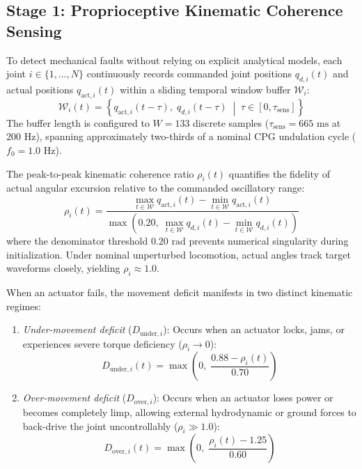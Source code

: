 \documentclass{iopjournal}
\begin{document}
\subsection{Stage 1: Proprioceptive Kinematic Coherence Sensing}
To detect mechanical faults without relying on explicit analytical models, each joint $i \in \{1, \dots, N\}$ continuously records commanded joint positions $q_{d,i}(t)$ and actual positions $q_{\text{act},i}(t)$ within a sliding temporal window buffer $\mathcal{W}_i$:
\begin{equation}
\mathcal{W}_i(t) = \left\{ q_{\text{act},i}(t - \tau), \; q_{d,i}(t - \tau) \;\middle|\; \tau \in [0, \tau_{\text{sens}}] \right\}
\end{equation}
The buffer length is configured to $W = 133$ discrete samples ($\tau_{\text{sens}} = 665\text{ ms}$ at $200\text{ Hz}$), spanning approximately two-thirds of a nominal CPG undulation cycle ($f_0 = 1.0\text{ Hz}$).

The peak-to-peak kinematic coherence ratio $\rho_i(t)$ quantifies the fidelity of actual angular excursion relative to the commanded oscillatory range:
\begin{equation}
\rho_i(t) = \frac{\max_{t \in \mathcal{W}} q_{\text{act},i}(t) - \min_{t \in \mathcal{W}} q_{\text{act},i}(t)}{\max\!\left(0.20,\; \max_{t \in \mathcal{W}} q_{d,i}(t) - \min_{t \in \mathcal{W}} q_{d,i}(t)\right)}
\label{eq:coherence_ratio}
\end{equation}
where the denominator threshold $0.20\text{ rad}$ prevents numerical singularity during initialization. Under nominal unperturbed locomotion, actual angles track target waveforms closely, yielding $\rho_i \approx 1.0$.

When an actuator fails, the movement deficit manifests in two distinct kinematic regimes:
\begin{enumerate}[label=(\alph*)]
  \item \textit{Under-movement deficit} ($D_{\text{under},i}$): Occurs when an actuator locks, jams, or experiences severe torque deficiency ($\rho_i \to 0$):
  \begin{equation}
  D_{\text{under},i}(t) = \max\!\left(0,\; \frac{0.88 - \rho_i(t)}{0.70}\right)
  \label{eq:deficit_under}
  \end{equation}
  \item \textit{Over-movement deficit} ($D_{\text{over},i}$): Occurs when an actuator loses power or becomes completely limp, allowing external hydrodynamic or ground forces to back-drive the joint uncontrollably ($\rho_i \gg 1.0$):
  \begin{equation}
  D_{\text{over},i}(t) = \max\!\left(0,\; \frac{\rho_i(t) - 1.25}{0.60}\right)
  \label{eq:deficit_over}
  \end{equation}
\end{enumerate}
\end{document}
